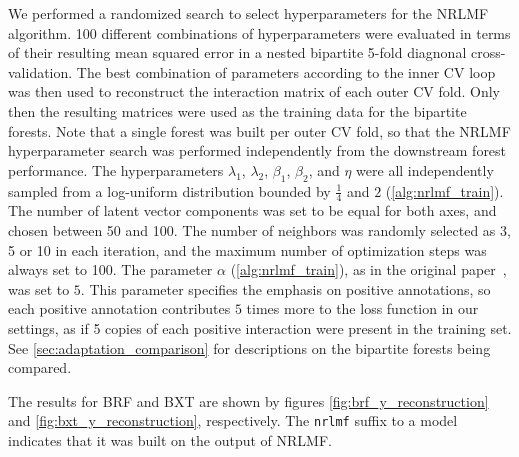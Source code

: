 We performed a randomized search to select hyperparameters for the NRLMF algorithm. 100 different combinations of hyperparameters were evaluated
in terms of their resulting mean squared error in a nested bipartite 5-fold diagnonal cross-validation.
The best combination of parameters according to the inner CV loop was then used to reconstruct the interaction matrix of each outer CV fold. Only then the resulting matrices were used as the training data for the bipartite forests. Note that a single forest was built per outer CV fold, so that the NRLMF hyperparameter search was performed independently from the downstream forest performance.
The hyperparameters $\lambda_1$, $\lambda_2$, $\beta_1$, $\beta_2$, and $\eta$ were all independently sampled from a log-uniform distribution bounded by $\frac{1}{4}$ and $2$ (\autoref{alg:nrlmf_train}).
The number of latent vector components was set to be equal for both axes, and chosen between 50 and 100. The number of neighbors was randomly selected as 3, 5 or 10 in each iteration, and the maximum number of optimization steps was always set to 100. The parameter $\alpha$ (\autoref{alg:nrlmf_train}), as in the original paper~\cite{liu2016neighborhood}, was set to $5$. This parameter specifies the emphasis on positive annotations, so each positive annotation contributes $5$ times more to the loss function in our settings, as if 5 copies of each positive interaction were present in the training set.
%
See \autoref{sec:adaptation_comparison} for descriptions on the bipartite forests being compared.

The results for BRF and BXT are shown by figures \ref{fig:brf_y_reconstruction} and \ref{fig:bxt_y_reconstruction}, respectively. The \texttt{nrlmf} suffix to a model indicates that it was built on the output of NRLMF.

